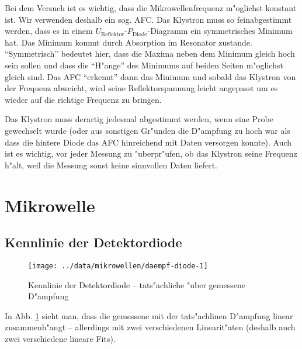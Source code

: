 \documentclass[a4paper,12pt]{article}
\begin{document}
Bei dem Versuch ist es wichtig, dass die Mikrowellenfrequenz
m"oglichst konstant ist. Wir verwenden deshalb ein sog. AFC. 
Das Klystron muss so feinabgestimmt werden, dass es in einem
$U_\text{Reflektor}$-$P_\text{Diode}$-Diagramm ein symmetrisches
Minimum hat. Das Minimum kommt durch Absorption im Resonator
zustande. "`Symmetrisch"' bedeutet hier, dass die Maxima neben dem
Minimum gleich hoch sein sollen und dass die "`H"ange"' des Minimums
auf beiden Seiten m"oglichst gleich sind.
Das AFC "`erkennt"' dann das Minimum und sobald das
Klystron von der Frequenz abweicht, wird seine Reflektorspannung
leicht angepasst um es wieder auf die richtige Frequenz zu bringen.

Das Klystron muss derartig jedesmal abgestimmt werden, wenn eine Probe
gewechselt wurde (oder aus sonstigen Gr"unden die D"ampfung zu hoch
war als dass die hintere Diode das AFC hinreichend mit Daten versorgen
konnte). Auch ist es wichtig, vor jeder Messung zu "uberpr"ufen, ob
das Klystron seine Frequenz h"alt, weil die Messung sonst keine
sinnvollen Daten liefert.










\section{Mikrowelle}
\label{sec:mikrowelle}





\subsection{Kennlinie der Detektordiode}
\label{sec:kennlinie_der_detektordiode}

\begin{figure}[!h]
  \centering
 \texttt{[image: ../data/mikrowellen/daempf-diode-1]} 
  \caption{Kennlinie der Detektordiode -- tats"achliche "uber gemessene D"ampfung}
  \label{fig:kennlinie_detektordiode}
\end{figure}


In Abb. \ref{fig:kennlinie_detektordiode} sieht man, dass die
gemessene mit der tats"achlinen D"ampfung linear zusammenh"angt --
allerdings mit zwei verschiedenen Linearit"aten (deshalb auch zwei
verschiedene lineare Fits).
\end{document}
